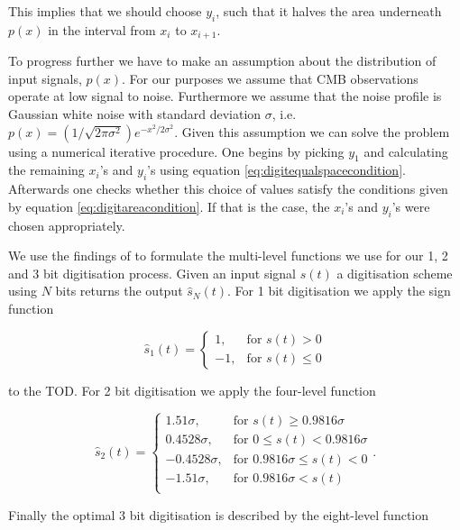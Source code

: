 \documentclass[apj]{emulateapj}
\begin{document}
This implies that we should choose $y_i$, such that it halves the area underneath $p(x)$ in the interval from $x_i$ to $x_{i+1}$.

To progress further we have to make an assumption about the distribution of input signals, $p(x)$. For our purposes we assume that CMB observations operate at low signal to noise. Furthermore we assume that the noise profile is Gaussian white noise with standard deviation $\sigma$, i.e. $p(x) = (1/\sqrt{2\pi\sigma^2}) e^{-x^2/2\sigma^2}$. Given this assumption we can solve the problem using a numerical iterative procedure. One begins by picking $y_1$ and calculating the remaining $x_i$'s and $y_i$'s using equation \ref{eq:digitequalspacecondition}. Afterwards one checks whether this choice of values satisfy the conditions given by equation \ref{eq:digitareacondition}. If that is the case, the $x_i$'s and $y_i$'s were chosen appropriately.

We use the findings of \cite{max1960} to formulate the multi-level functions we use for our 1, 2 and 3 bit digitisation process. Given an input signal $s(t)$ a digitisation scheme using $N$ bits returns the output $\hat{s}_N(t)$. For 1 bit digitisation we apply the sign function

\begin{equation} \hat{s}_1(t) = \left\{ \begin{array}{lr}
1, & \text{for } s(t) > 0\\
-1, & \text{for } s(t) \leq 0
\end{array} \right. \end{equation}

to the TOD. For 2 bit digitisation we apply the four-level function

\begin{equation} \hat{s}_2(t) = \left\{ \begin{array}{rl}
1.51 \sigma, & \text{for } s(t) \geq 0.9816 \sigma\\
0.4528 \sigma, & \text{for } 0 \leq s(t) < 0.9816 \sigma\\
-0.4528 \sigma, & \text{for } 0.9816 \sigma \leq s(t) < 0\\
-1.51 \sigma, & \text{for } 0.9816 \sigma < s(t)\\
\end{array} \right. . \end{equation}

Finally the optimal 3 bit digitisation is described by the eight-level function
\end{document}
